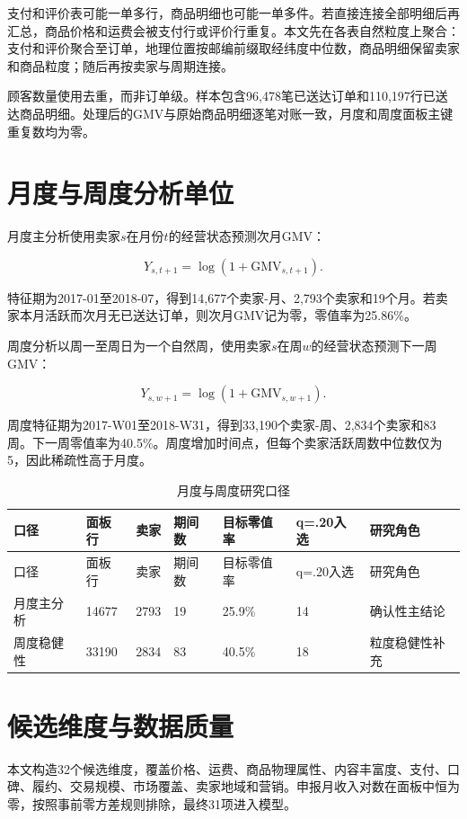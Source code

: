 \documentclass{sufethesismas}
\begin{document}
支付和评价表可能一单多行，商品明细也可能一单多件。若直接连接全部明细后再汇总，商品价格和运费会被支付行或评价行重复。本文先在各表自然粒度上聚合：支付和评价聚合至订单，地理位置按邮编前缀取经纬度中位数，商品明细保留卖家和商品粒度；随后再按卖家与周期连接。

顾客数量使用\texttt{}去重，而非订单级\texttt{}。样本包含96,478笔已送达订单和110,197行已送达商品明细。处理后的GMV与原始商品明细逐笔对账一致，月度和周度面板主键重复数均为零。

\section{月度与周度分析单位}

月度主分析使用卖家\(s\)在月份\(t\)的经营状态预测次月GMV：

\[
Y_{s,t+1}=\log(1+\mathrm{GMV}_{s,t+1}).
\]

特征期为2017-01至2018-07，得到14,677个卖家-月、2,793个卖家和19个月。若卖家本月活跃而次月无已送达订单，则次月GMV记为零，零值率为25.86\%。

周度分析以周一至周日为一个自然周，使用卖家\(s\)在周\(w\)的经营状态预测下一周GMV：

\[
Y_{s,w+1}=\log(1+\mathrm{GMV}_{s,w+1}).
\]

周度特征期为2017-W01至2018-W31，得到33,190个卖家-周、2,834个卖家和83周。下一周零值率为40.5\%。周度增加时间点，但每个卖家活跃周数中位数仅为5，因此稀疏性高于月度。

\begin{longtable}[]{@{}lllllll@{}}
\caption{月度与周度研究口径}\tabularnewline
\toprule\noalign{}
口径 & 面板行 & 卖家 & 期间数 & 目标零值率 & q=.20入选 & 研究角色 \\
\midrule\noalign{}
\endfirsthead
\toprule\noalign{}
口径 & 面板行 & 卖家 & 期间数 & 目标零值率 & q=.20入选 & 研究角色 \\
\midrule\noalign{}
\endhead
\bottomrule\noalign{}
\endlastfoot
月度主分析 & 14677 & 2793 & 19 & 25.9\% & 14 & 确认性主结论 \\
周度稳健性 & 33190 & 2834 & 83 & 40.5\% & 18 & 粒度稳健性补充 \\
\end{longtable}

\section{候选维度与数据质量}

本文构造32个候选维度，覆盖价格、运费、商品物理属性、内容丰富度、支付、口碑、履约、交易规模、市场覆盖、卖家地域和营销。申报月收入对数在面板中恒为零，按照事前零方差规则排除，最终31项进入模型。
\end{document}
